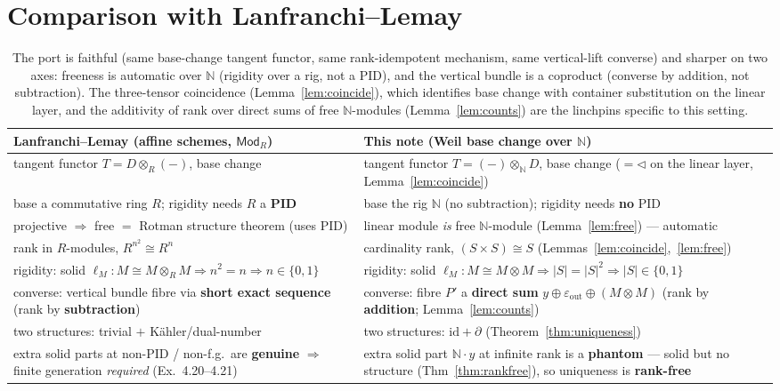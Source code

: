 \documentclass[11pt]{article}
\theoremstyle{definition}
\newcommand{\Mod}{\mathsf{Mod}}
\newcommand{\N}{\mathbb{N}}
\newcommand{\id}{\mathrm{id}}
\begin{document}
\section{Comparison with Lanfranchi--Lemay}\label{sec:compare}

\begin{table}[h]
\centering
\begin{tabular}{p{}p{}}
\toprule
Lanfranchi--Lemay (affine schemes, $\Mod_R$) & This note (Weil base change over $\N$) \\
\midrule
tangent functor $T=D\otimes_R(-)$, base change & tangent functor $T=(-)\otimes_\N D$, base change
  ($=\lhd$ on the linear layer, Lemma~\ref{lem:coincide}) \\
base a commutative ring $R$; rigidity needs $R$ a \textbf{PID} &
  base the rig $\N$ (no subtraction); rigidity needs \textbf{no} PID \\
projective $\Rightarrow$ free $=$ Rotman structure theorem (uses PID) &
  linear module \emph{is} free $\N$-module (Lemma~\ref{lem:free}) --- automatic \\
rank in $R$-modules, $R^{n^2}\cong R^n$ &
  cardinality rank, $(S\times S)\cong S$ (Lemmas~\ref{lem:coincide},~\ref{lem:free}) \\
rigidity: solid $\ell_M\colon M\cong M\otimes_R M\Rightarrow n^2=n\Rightarrow n\in\{0,1\}$ &
  rigidity: solid $\ell_M\colon M\cong M\otimes M\Rightarrow|S|=|S|^2\Rightarrow|S|\in\{0,1\}$ \\
converse: vertical bundle fibre via \textbf{short exact sequence} (rank by \textbf{subtraction}) &
  converse: fibre $P'$ a \textbf{direct sum} $y\oplus\varepsilon_{\mathrm{out}}\oplus(M\otimes M)$
  (rank by \textbf{addition}; Lemma~\ref{lem:counts}) \\
two structures: trivial $+$ Kähler/dual-number &
  two structures: $\id+\partial$ (Theorem~\ref{thm:uniqueness}) \\
extra solid parts at non-PID / non-f.g.\ are \textbf{genuine} $\Rightarrow$ finite generation
  \emph{required} (Ex.~4.20--4.21) &
  extra solid part $\N\cdot y$ at infinite rank is a \textbf{phantom} --- solid but no structure
  (Thm~\ref{thm:rankfree}), so uniqueness is \textbf{rank-free} \\
\bottomrule
\end{tabular}
\caption{The port is faithful (same base-change tangent functor, same rank-idempotent mechanism,
same vertical-lift converse) and sharper on two axes: freeness is automatic over $\N$ (rigidity over
a rig, not a PID), and the vertical bundle is a coproduct (converse by addition, not subtraction).
The three-tensor coincidence (Lemma~\ref{lem:coincide}), which identifies base change with container
substitution on the linear layer, and the additivity of rank over direct sums of free $\N$-modules
(Lemma~\ref{lem:counts}) are the linchpins specific to this setting.}
\label{tab:compare}
\end{table}
\end{document}
